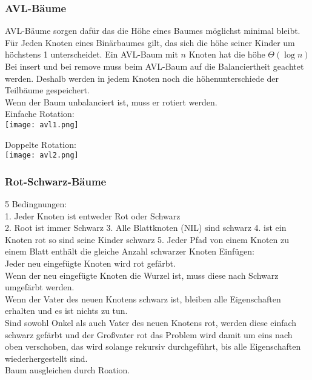 \documentclass[a4paper]{scrartcl}
\begin{document}
\subsubsection{AVL-Bäume}
AVL-Bäume sorgen dafür das die Höhe eines Baumes möglichst minimal bleibt.\\
Für Jeden Knoten eines Binärbaumes gilt, das sich die höhe seiner Kinder um höchstens 1 unterscheidet. 
Ein AVL-Baum mit $n$ Knoten hat die höhe $\Theta(\log n)$\\
Bei insert und bei remove muss beim AVL-Baum auf die Balanciertheit geachtet werden. Deshalb werden in jedem Knoten noch die höhenunterschiede der Teilbäume gespeichert.\\
Wenn der Baum unbalanciert ist, muss er rotiert werden.\\

Einfache Rotation:\\
\texttt{[image: avl1.png]}

Doppelte Rotation:\\
\texttt{[image: avl2.png]}

\subsubsection{Rot-Schwarz-Bäume}
5 Bedingnungen:\\
1. Jeder Knoten ist entweder Rot oder Schwarz\\
2. Root ist immer Schwarz
3. Alle Blattknoten (NIL) sind schwarz
4. ist ein Knoten rot so sind seine Kinder schwarz
5. Jeder Pfad von einem Knoten zu einem Blatt enthält die gleiche Anzahl schwarzer Knoten
Einfügen:\\
Jeder neu eingefügte Knoten wird rot gefärbt.\\
Wenn der neu eingefügte Knoten die Wurzel ist, muss diese nach Schwarz umgefärbt werden.\\
Wenn der Vater des neuen Knotens schwarz ist, bleiben alle Eigenschaften erhalten und es ist nichts zu tun.\\
Sind sowohl Onkel als auch Vater des neuen Knotens rot, werden diese einfach schwarz gefärbt und der Großvater rot das Problem wird damit um eins nach oben verschoben, das wird solange rekursiv durchgeführt, bis alle Eigenschaften wiederhergestellt sind.\\
Baum ausgleichen durch Roation.\\
\end{document}
